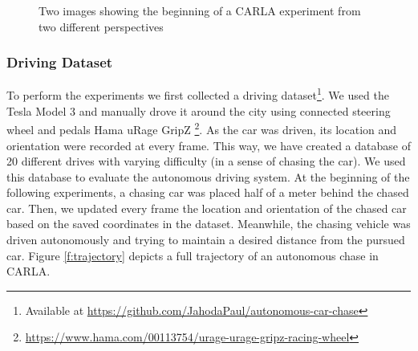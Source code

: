 \documentclass{ctuthesis/ctuthesis}
\begin{document}
\begin{figure}[]
    \centering
    \qquad
    \caption{Two images showing the beginning of a CARLA experiment from two different perspectives}%
    \label{fig:CARLA}%
\end{figure}



\subsubsection{Driving Dataset} \label{s:drivingDataset}
To perform the experiments we first collected a driving dataset\footnote{Available at \href{https://github.com/JahodaPaul/autonomous-car-chase}{https://github.com/JahodaPaul/autonomous-car-chase}}. We used the Tesla Model 3 and manually drove it around the city using connected steering wheel and pedals Hama uRage GripZ \footnote{\href{https://www.hama.com/00113754/urage-urage-gripz-racing-wheel}{https://www.hama.com/00113754/urage-urage-gripz-racing-wheel}}. As the car was driven, its location and orientation were recorded at every frame. This way, we have created a database of 20 different drives with varying difficulty (in a sense of chasing the car). We used this database to evaluate the autonomous driving system. At the beginning of the following experiments, a chasing car was placed half of a meter behind the chased car. Then, we updated every frame the location and orientation of the chased car based on the saved coordinates in the dataset. Meanwhile, the chasing vehicle was driven autonomously and trying to maintain a desired distance from the pursued car. Figure \ref{f:trajectory} depicts a full trajectory of an autonomous chase in CARLA.\par
\end{document}
